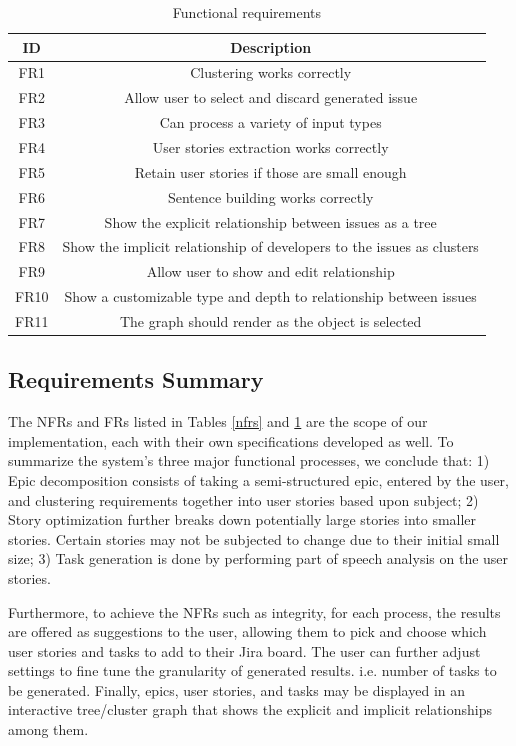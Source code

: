 \begin{table}
\centering
\caption{Functional requirements}
\label{frt}
\begin{tabular}{ |c|c| } 
\hline
\multicolumn{1}{|c|}{\textbf{ID}} & \multicolumn{1}{c|}{\textbf{Description}} \\
\hline
FR1 & Clustering works correctly \\
\hline
FR2 & Allow user to select and discard generated issue \\
\hline
FR3 & Can process a variety of input types \\
\hline
FR4 & User stories extraction works correctly \\
\hline
FR5 & Retain user stories if those are small enough \\
\hline
FR6 & Sentence building works correctly \\
\hline
FR7 & Show the explicit relationship between issues as a tree \\
\hline
FR8 & Show the implicit relationship of developers to the issues as clusters \\
\hline
FR9 & Allow user to show and edit relationship \\
\hline
FR10 & Show a customizable type and depth to relationship between issues \\
\hline
FR11 & The graph should render as the object is selected \\
\hline
\end{tabular}
\end{table}

\subsection{Requirements Summary}
The NFRs and FRs listed in Tables \ref{nfrs} and \ref{frt} are the scope of our implementation, each with their own specifications developed as well. To summarize the system's three major functional processes, we conclude that: 1) Epic decomposition consists of taking a semi-structured epic, entered by the user, and clustering requirements together into user stories based upon subject; 2) Story optimization further breaks down potentially large stories into smaller stories. Certain stories may not be subjected to change due to their initial small size; 3) Task generation is done by performing part of speech analysis on the user stories. 

Furthermore, to achieve the NFRs such as integrity, for each process, the results are offered as suggestions to the user, allowing them to pick and choose which user stories and tasks to add to their Jira board. The user can further adjust settings to fine tune the granularity of generated results. i.e. number of tasks to be generated. Finally, epics, user stories, and tasks may be displayed in an interactive tree/cluster graph that shows the explicit and implicit relationships among them.

